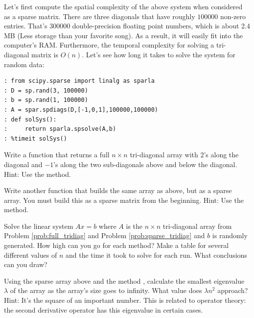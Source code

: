 Let's first compute the spatial complexity of the above system when
considered as a sparse matrix.  There are three diagonals that have
roughly $100000$ non-zero entries.  That's $300000$
double-precision floating point numbers, which is about 2.4 MB (Less
storage than your favorite song).  As a result, it will easily
fit into the computer's RAM.  Furthermore, the temporal complexity for solving
a tri-diagonal matrix is $O(n)$. Let's see how long it takes to
solve the system for random data:
\begin{lstlisting}
: from scipy.sparse import linalg as sparla
: D = sp.rand(3, 100000)
: b = sp.rand(1, 100000)
: A = spar.spdiags(D,[-1,0,1],100000,100000)
: def solSys():
:     return sparla.spsolve(A,b)
: %timeit solSys()
\end{lstlisting}

\begin{problem}
Write a function that returns a full $n\times n$
tri-diagonal array with $2$'s along the diagonal and $-1$'s along
the two sub-diagonals above and below the diagonal. 
Hint: Use the  method.
\label{prob:full_tridiag}
\end{problem}

\begin{problem}
Write another function that builds the same array as above, but as a sparse array. 
You must build this as a sparse matrix from the beginning. 
Hint: Use the  method.
\label{prob:sparse_tridiag}
\end{problem}

\begin{problem}
Solve the linear system $Ax = b$ where $A$ is the $n\times n$
tri-diagonal array from Problem \ref{prob:full_tridiag} and Problem \ref{prob:sparse_tridiag} and $b$ is randomly
generated.  How high can you go for each method?  Make a table for
several different values of $n$ and the time it took to solve for
each run.  What conclusions can you draw?
\end{problem}

\begin{problem}
Using the sparse array above and the method , 
calculate the smallest eigenvalue $\lambda$ of the array as the array's size goes to infinity. 
What value does $\lambda n^2$ approach?  
Hint: It's the square of an important number. 
This is related to operator theory: the second derivative operator has this eigenvalue in certain cases.
\end{problem}

